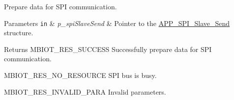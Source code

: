 Prepare data for S\+PI communication. 


\begin{DoxyParams}[1]{Parameters}
\mbox{\tt in}  & {\em p\+\_\+spi\+Slave\+Send} & Pointer to the \hyperlink{struct_a_p_p___s_p_i___slave___send}{A\+P\+P\+\_\+\+S\+P\+I\+\_\+\+Slave\+\_\+\+Send} structure.\\
\hline
\end{DoxyParams}
\begin{DoxyReturn}{Returns}
M\+B\+I\+O\+T\+\_\+\+R\+E\+S\+\_\+\+S\+U\+C\+C\+E\+SS Successfully prepare data for S\+PI communication. 

M\+B\+I\+O\+T\+\_\+\+R\+E\+S\+\_\+\+N\+O\+\_\+\+R\+E\+S\+O\+U\+R\+CE S\+PI bus is busy. 

M\+B\+I\+O\+T\+\_\+\+R\+E\+S\+\_\+\+I\+N\+V\+A\+L\+I\+D\+\_\+\+P\+A\+RA Invalid parameters. 
\end{DoxyReturn}
